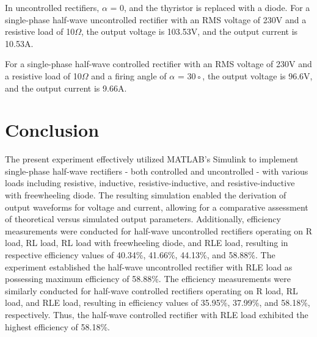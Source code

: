 In uncontrolled rectifiers, $ \alpha$ = 0, and the thyristor is replaced with a diode.
For a single-phase half-wave uncontrolled rectifier with an RMS voltage of 230V
and a resistive load of 10$ \Omega $,
the output voltage is 103.53V, and the output current is 10.53A.

For a single-phase half-wave controlled rectifier with an RMS voltage of 230V
and a resistive load of 10$ \Omega $ and a firing angle of $ \alpha  $ = 30◦, the output voltage
is 96.6V, and the output current is 9.66A.

\pagebreak











\section{Conclusion}


\hspace{\parindent}

The present experiment effectively utilized MATLAB's Simulink to implement single-phase half-wave rectifiers - both controlled and uncontrolled - with various loads including resistive, inductive, resistive-inductive, and resistive-inductive with freewheeling diode. The resulting simulation enabled the derivation of output waveforms for voltage and current, allowing for a comparative assessment of theoretical versus simulated output parameters. Additionally, efficiency measurements were conducted for half-wave uncontrolled rectifiers operating on R load, RL load, RL load with freewheeling diode, and RLE load, resulting in respective efficiency values of 40.34\%, 41.66\%, 44.13\%, and 58.88\%. The experiment established the half-wave uncontrolled rectifier with RLE load as possessing maximum efficiency of 58.88\%. The efficiency measurements were similarly conducted for half-wave controlled rectifiers operating on R load, RL load, and RLE load, resulting in efficiency values of 35.95\%, 37.99\%, and 58.18\%, respectively. Thus, the half-wave controlled rectifier with RLE load exhibited the highest efficiency of 58.18\%.
\pagebreak
